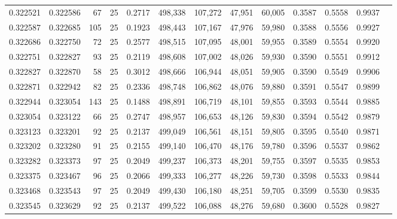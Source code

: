 \begin{tabular}{rrrrrrrrrrrrr}
0.322521 & 0.322586 &    67 &  25 &                                     0.2717 & 498,338 & 107,272 &  47,951 &  60,005 & 0.3587 & 0.5558 & 0.9937 \\
0.322587 & 0.322685 &   105 &  25 &                                     0.1923 & 498,443 & 107,167 &  47,976 &  59,980 & 0.3588 & 0.5556 & 0.9927 \\
0.322686 & 0.322750 &    72 &  25 &                                     0.2577 & 498,515 & 107,095 &  48,001 &  59,955 & 0.3589 & 0.5554 & 0.9920 \\
0.322751 & 0.322827 &    93 &  25 &                                     0.2119 & 498,608 & 107,002 &  48,026 &  59,930 & 0.3590 & 0.5551 & 0.9912 \\
0.322827 & 0.322870 &    58 &  25 &                                     0.3012 & 498,666 & 106,944 &  48,051 &  59,905 & 0.3590 & 0.5549 & 0.9906 \\
0.322871 & 0.322942 &    82 &  25 &                                     0.2336 & 498,748 & 106,862 &  48,076 &  59,880 & 0.3591 & 0.5547 & 0.9899 \\
0.322944 & 0.323054 &   143 &  25 &                                     0.1488 & 498,891 & 106,719 &  48,101 &  59,855 & 0.3593 & 0.5544 & 0.9885 \\
0.323054 & 0.323122 &    66 &  25 &                                     0.2747 & 498,957 & 106,653 &  48,126 &  59,830 & 0.3594 & 0.5542 & 0.9879 \\
0.323123 & 0.323201 &    92 &  25 &                                     0.2137 & 499,049 & 106,561 &  48,151 &  59,805 & 0.3595 & 0.5540 & 0.9871 \\
0.323202 & 0.323280 &    91 &  25 &                                     0.2155 & 499,140 & 106,470 &  48,176 &  59,780 & 0.3596 & 0.5537 & 0.9862 \\
0.323282 & 0.323373 &    97 &  25 &                                     0.2049 & 499,237 & 106,373 &  48,201 &  59,755 & 0.3597 & 0.5535 & 0.9853 \\
0.323375 & 0.323467 &    96 &  25 &                                     0.2066 & 499,333 & 106,277 &  48,226 &  59,730 & 0.3598 & 0.5533 & 0.9844 \\
0.323468 & 0.323543 &    97 &  25 &                                     0.2049 & 499,430 & 106,180 &  48,251 &  59,705 & 0.3599 & 0.5530 & 0.9835 \\
0.323545 & 0.323629 &    92 &  25 &                                     0.2137 & 499,522 & 106,088 &  48,276 &  59,680 & 0.3600 & 0.5528 & 0.9827 \\

\end{tabular}
